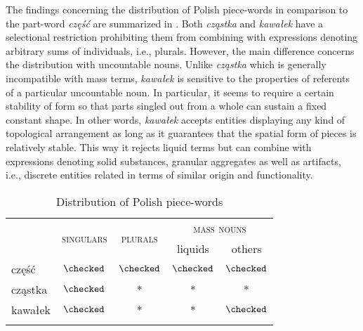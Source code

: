 The findings concerning the distribution of Polish piece-words in comparison to the part-word \textit{część} are summarized in  . Both \textit{cząstka} and \textit{kawałek} have a selectional restriction prohibiting them from combining with expressions denoting arbitrary sums of individuals, i.e., plurals. However, the main difference concerns the distribution with uncountable nouns. Unlike \textit{cząstka} which is generally incompatible with mass terms, \textit{kawałek} is sensitive to the properties of referents of a particular uncountable noun. In particular, it seems to require a certain stability of form so that parts singled out from a whole can sustain a fixed constant shape. In other words, \textit{kawałek} accepts entities displaying any kind of topological arrangement as long as it guarantees that the spatial form of pieces is relatively stable. This way it rejects liquid terms but can combine with expressions denoting solid substances, granular aggregates as well as artifacts, i.e., discrete entities related in terms of similar origin and functionality.

\begin{table}[h]
\centering
\begin{tabular}{lcccc}
\lsptoprule
\multirow{2}{*}{} & \multirow{2}{*}{\textsc{singulars}} & \multirow{2}{*}{\textsc{plurals}} & \multicolumn{2}{c}{\textsc{mass nouns}} \\
                  &                                                      &                                                    & liquids                  & others                        \\ \midrule
część             & $\checked$                                         & $\checked$                                       & $\checked$ & $\checked$                         \\
cząstka           & $\checked$                                         & *                                                  & * & *                                    \\
kawałek           & $\checked$                                         & *                                                  & *                        & $\checked$                  \\ \lspbottomrule
\end{tabular}
\caption{Distribution of Polish piece-words}\label{tab:distribution-of-polish-piece-words}
\end{table}

